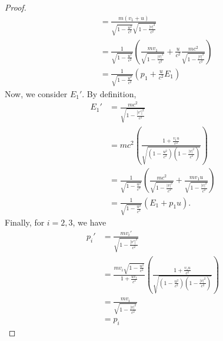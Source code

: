 \documentclass{article}
\begin{document}
\begin{proof}
\begin{align*}
        &=\frac{m(v_1+u)}{\sqrt{1-\frac{u^2}{c^2}}\sqrt{1-\frac{|v|^2}{c^2}}}\\
        &=\frac{1}{\sqrt{1-\frac{u^2}{c^2}}}\left(\frac{mv_1}{\sqrt{1-\frac{|v|^2}{c^2}}} + \frac{u}{c^2}\frac{mc^2}{\sqrt{1-\frac{|v|^2}{c^2}}}\right)\\
        &=\frac{1}{\sqrt{1-\frac{u^2}{c^2}}}\left(p_1 + \frac{u}{c^2}E_1\right)
    \end{align*}
    Now, we consider $E_1'$. By definition,
    \begin{align*}
        E_1'&=\frac{mc^2}{\sqrt{1-\frac{|v'|^2}{c^2}}}\\
        &=mc^2\left(\frac{1+\frac{v_1u}{c^2}}{\sqrt{\left(1-\frac{u^2}{c^2}\right)\left(1-\frac{|v|^2}{c^2}\right)}}\right)\\
        &=\frac{1}{\sqrt{1-\frac{u^2}{c^2}}}\left(\frac{mc^2}{\sqrt{1-\frac{|v|^2}{c^2}}}+\frac{mv_1 u}{\sqrt{1-\frac{|v|^2}{c^2}}}\right)\\
        &=\frac{1}{\sqrt{1-\frac{u^2}{c^2}}}(E_1 + p_1u).
    \end{align*}
    Finally, for $i=2,3$, we have
    \begin{align*}
        p_i'&= \frac{mv_i'}{\sqrt{1-\frac{|v'|^2}{c^2}}}\\
        &=\frac{mv_i\sqrt{1-\frac{u^2}{c^2}}}{1+\frac{uv_1}{c^2}}\left(\frac{1+\frac{v_1u}{c^2}}{\sqrt{\left(1-\frac{u^2}{c^2}\right)\left(1-\frac{|v|^2}{c^2}\right)}}\right)\\
        &=\frac{mv_i}{\sqrt{1-\frac{|v|^2}{c^2}}}\\
        &= p_i
    \end{align*}
\end{proof}
\end{document}
